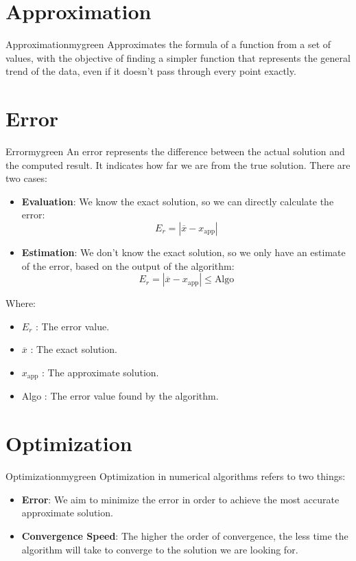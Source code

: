 \vspace{0.35cm}

\section{Approximation}
\begin{prettyBox}{Approximation}{mygreen}
Approximates the formula of a function from a set of values, with the objective of finding a simpler function that represents the general trend of the data, even if it doesn't pass through every point exactly.
\end{prettyBox}

\vspace{0.35cm}

\section{Error}
\begin{prettyBox}{Error}{mygreen}
An error represents the difference between the actual solution and the computed result. It indicates how far we are from the true solution. There are two cases:
\begin{itemize}
    \item \textbf{Evaluation}: We know the exact solution, so we can directly calculate the error:
        \[   \boxed{E_r = |\overline{x} - x_{\text{app}}|} \]
    \item \textbf{Estimation}: We don't know the exact solution, so we only have an estimate of the error, based on the output of the algorithm:
        \[      \boxed{E_r = |\overline{x} - x_{\text{app}}| \leq \text{Algo}} \]
\end{itemize}

Where:
\begin{itemize}
    \item \(E_r\) : The error value.
    \item \(\overline{x}\) : The exact solution.
    \item \(x_{\text{app}}\) : The approximate solution.
    \item Algo : The error value found by the algorithm.
\end{itemize}
\end{prettyBox}

\vspace{0.35cm}

\section{Optimization}
\begin{prettyBox}{Optimization}{mygreen}
Optimization in numerical algorithms refers to two things:
\begin{itemize}
    \item \textbf{Error}: We aim to minimize the error in order to achieve the most accurate approximate solution.
    \item \textbf{Convergence Speed}: The higher the order of convergence, the less time the algorithm will take to converge to the solution we are looking for.
\end{itemize}
\end{prettyBox}

